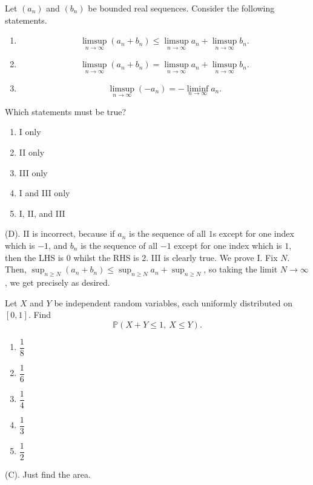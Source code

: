 \begin{exercise}
Let $(a_n)$ and $(b_n)$ be bounded real sequences. Consider the following statements.
\begin{enumerate}[label=\Roman*.]
    \item
    \[
    \limsup_{n\to\infty}(a_n+b_n)
    \le
    \limsup_{n\to\infty}a_n
    +
    \limsup_{n\to\infty}b_n.
    \]

    \item
    \[
    \limsup_{n\to\infty}(a_n+b_n)
    =
    \limsup_{n\to\infty}a_n
    +
    \limsup_{n\to\infty}b_n.
    \]

    \item
    \[
    \limsup_{n\to\infty}(-a_n)
    =
    -\liminf_{n\to\infty}a_n.
    \]
\end{enumerate}
Which statements must be true?
\begin{enumerate}[label=(\Alph*)]
    \item I only
    \item II only
    \item III only
    \item I and III only
    \item I, II, and III
\end{enumerate}
\end{exercise}
\begin{solution}
(D). II is incorrect, because if $a_n$ is the sequence of all $1$s except for one index
which is $-1$, and $b_n$ is the sequence of all $-1$ except for one index which is $1$, then 
the LHS is $0$ whilst the RHS is $2$. III is clearly true.
We prove I. Fix $N$. Then, $\sup_{n \geq N} (a_n + b_n) \leq \sup_{n \geq N} a_n + \sup_{n \geq N}$,
so taking the limit $N \rightarrow \infty$, we get precisely as desired.
\end{solution}


\begin{exercise}
Let $X$ and $Y$ be independent random variables, each uniformly distributed on $[0,1]$. Find
\[
\mathbb P(X+Y\le1,\ X\le Y).
\]
\begin{enumerate}[label=(\Alph*)]
    \item $\dfrac18$
    \item $\dfrac16$
    \item $\dfrac14$
    \item $\dfrac13$
    \item $\dfrac12$
\end{enumerate}
\end{exercise}
\begin{solution}
(C). Just find the area.
\end{solution}



